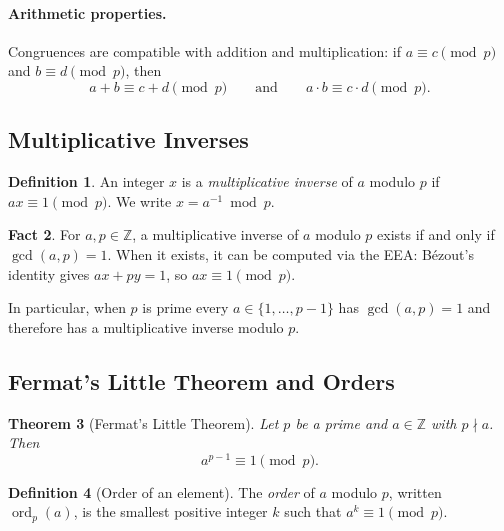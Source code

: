 \documentclass[11pt]{article}
\theoremstyle{plain}
\newtheorem{theorem}{Theorem}[section]
\theoremstyle{definition}
\newtheorem{definition}[theorem]{Definition}
\newtheorem{fact}[theorem]{Fact}
\newcommand{\Z}{\mathbb{Z}}
\DeclareMathOperator{\ord}{ord}
\begin{document}
\paragraph{Arithmetic properties.}  Congruences are compatible with
addition and multiplication: if $a \equiv c \pmod{p}$ and
$b \equiv d \pmod{p}$, then
\[
  a + b \equiv c + d \pmod{p}
  \qquad \text{and} \qquad
  a \cdot b \equiv c \cdot d \pmod{p}.
\]

\subsection{Multiplicative Inverses}

\begin{definition}
  An integer $x$ is a \emph{multiplicative inverse} of $a$ modulo $p$
  if $ax \equiv 1 \pmod{p}$.  We write $x = a^{-1} \bmod p$.
\end{definition}

\begin{fact}
  For $a, p \in \Z$, a multiplicative inverse of $a$ modulo $p$ exists
  if and only if $\gcd(a, p) = 1$.  When it exists, it can be computed
  via the EEA: B\'ezout's identity gives $ax + py = 1$, so
  $ax \equiv 1 \pmod{p}$.
\end{fact}

In particular, when $p$ is prime every $a \in \{1, \ldots, p-1\}$ has
$\gcd(a, p) = 1$ and therefore has a multiplicative inverse modulo $p$.

\subsection{Fermat's Little Theorem and Orders}

\begin{theorem}[Fermat's Little Theorem]
  Let $p$ be a prime and $a \in \Z$ with $p \nmid a$.  Then
  \[
    a^{p-1} \equiv 1 \pmod{p}.
  \]
\end{theorem}

\begin{definition}[Order of an element]
  The \emph{order} of $a$ modulo $p$, written $\ord_p(a)$, is the
  smallest positive integer $k$ such that $a^k \equiv 1 \pmod{p}$.
\end{definition}
\end{document}
